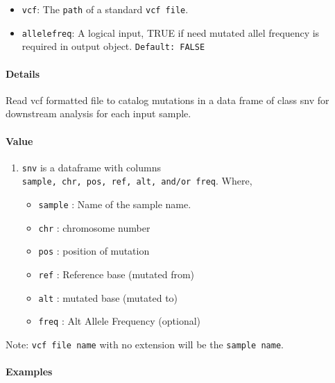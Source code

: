\documentclass[]{article}
\providecommand{\tightlist}{%
  \setlength{\itemsep}{0pt}\setlength{\parskip}{0pt}}
\let\oldparagraph\paragraph
\renewcommand{\paragraph}[1]{\oldparagraph{#1}\mbox{}}
\begin{document}
\begin{itemize}
\tightlist
\item
  \texttt{vcf}: The \texttt{path} of a standard \texttt{vcf\ file}.
\item
  \texttt{allelefreq}: A logical input, TRUE if need mutated allel
  frequency is required in output object. \texttt{Default:\ FALSE}
\end{itemize}

\paragraph{\texorpdfstring{\textbf{Details}}{Details}}\label{details}

Read vcf formatted file to catalog mutations in a data frame of class
snv for downstream analysis for each input sample.

\hypertarget{snv}{\paragraph{\texorpdfstring{\textbf{Value}}{Value}}\label{snv}}

\begin{enumerate}
\def\labelenumi{\arabic{enumi}.}
\tightlist
\item
  \texttt{snv} is a dataframe with columns
  \texttt{sample,\ chr,\ pos,\ ref,\ alt,\ and/or\ freq}. Where,

  \begin{itemize}
  \tightlist
  \item
    \texttt{sample} : Name of the sample name.
  \item
    \texttt{chr} : chromosome number
  \item
    \texttt{pos} : position of mutation
  \item
    \texttt{ref} : Reference base (mutated from)
  \item
    \texttt{alt} : mutated base (mutated to)
  \item
    \texttt{freq} : Alt Allele Frequency (optional)
  \end{itemize}
\end{enumerate}

Note: \texttt{vcf\ file\ name} with no extension will be the
\texttt{sample\ name}.

\paragraph{\texorpdfstring{\textbf{Examples}}{Examples}}\label{examples}
\end{document}
